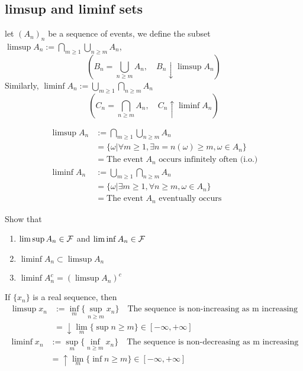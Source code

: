 \subsection{limsup and liminf sets}
\begin{dfn}
let $(A_n)_n$ be a sequence of events, we define the subset $\limsup A_n := \bigcap\limits_{m\geq 1}\bigcup\limits_{n\geq m}A_n$,
\begin{equation*}
    (B_n = \bigcup\limits_{n\geq m}A_n,\quad B_n\downarrow \limsup A_n)
\end{equation*}
Similarly, $\liminf A_n := \bigcup\limits_{m\geq 1}\bigcap\limits_{n\geq m}A_n$
\begin{equation*}
    (C_n = \bigcap\limits_{n\geq m}A_n,\quad C_n\uparrow \liminf A_n)
\end{equation*}
\end{dfn}
\begin{rem}
\begin{align*}
    \limsup A_n &:= \bigcap\limits_{m\geq 1}\bigcup\limits_{n\geq m}A_n \\
    &= \{\omega | \forall m\geq 1, \exists n = n(\omega) \geq m, \omega \in A_n \} \\
    &= \text{The event $A_n$ occurs infinitely often (i.o.)} \\
    \liminf A_n &:= \bigcup\limits_{m\geq 1}\bigcap\limits_{n\geq m}A_n \\
    &= \{\omega | \exists m\geq 1, \forall n \geq m, \omega \in A_n \} \\
    &= \text{The event $A_n$ eventually occurs}
\end{align*}
\end{rem}
\newpage
\begin{ex}
Show that \begin{enumerate}
    \item $\limsup A_n \in \mathcal{F}$ and $\liminf A_n \in \mathcal{F}$
    \item $\liminf A_n \subset \limsup A_n$
    \item $\liminf A_n^c = (\limsup A_n)^c$
\end{enumerate}
\end{ex}
\begin{rem}
If $\{x_n\}$ is a real sequence, then 
\begin{align*}  
    \limsup x_n &:= \inf\limits_{m}\{\sup\limits_{n\geq m} x_n\} \quad \text{The sequence is non-increasing as m increasing}\\
    &= \downarrow \lim\limits_{m} \{\sup\limits{n\geq m}\} \in [-\infty, +\infty]
\end{align*}
\begin{align*}  
    \liminf x_n &:= \sup\limits_{m}\{\inf\limits_{n\geq m} x_n\} \quad \text{The sequence is non-decreasing as m increasing}\\
    &= \uparrow \lim\limits_{m} \{\inf\limits{n\geq m}\} \in [-\infty, +\infty]
\end{align*}
\end{rem}
